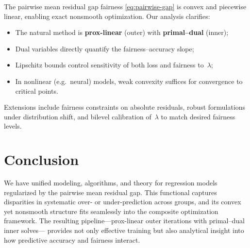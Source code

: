 \documentclass[11pt]{article}
\theoremstyle{plain}
\theoremstyle{definition}
\newcommand{\1}{\mathbf{1}}
\begin{document}
The pairwise mean residual gap fairness \eqref{eq:pairwise-gap}
is convex and piecewise linear, enabling exact nonsmooth optimization.
Our analysis clarifies:
\begin{itemize}[leftmargin=2em]
\item The natural method is \textbf{prox-linear} (outer) with \textbf{primal–dual} (inner);
\item Dual variables directly quantify the fairness–accuracy slope;
\item Lipschitz bounds control sensitivity of both loss and fairness to~$\lambda$;
\item In nonlinear (e.g.\ neural) models, weak convexity suffices for convergence to critical points.
\end{itemize}
Extensions include fairness constraints on absolute residuals,
robust formulations under distribution shift,
and bilevel calibration of~$\lambda$ to match desired fairness levels.

\section*{Conclusion}
We have unified modeling, algorithms, and theory for regression models regularized
by the pairwise mean residual gap.
This functional captures disparities in systematic over- or under-prediction across groups,
and its convex yet nonsmooth structure fits seamlessly into the composite optimization framework.
The resulting pipeline—prox-linear outer iterations with primal–dual inner solves—
provides not only effective training but also analytical insight into how predictive accuracy
and fairness interact.
\end{document}
